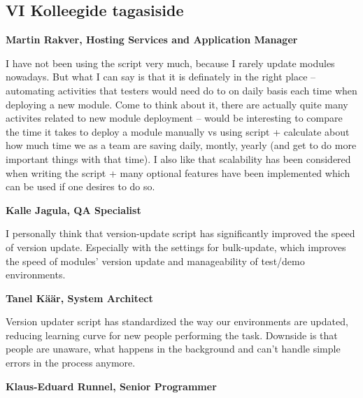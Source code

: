 \documentclass[12pt]{article}
\begin{document}
  \subsection*{VI Kolleegide tagasiside}
  \label{feedback}
  
  \textbf{Martin Rakver, Hosting Services and Application Manager}
  
  \begin{displayquote}
  I have not been using the script very much, because I rarely update modules nowadays. But what I can say is that it is definately in the right place – automating activities that testers would need do to on daily basis each time when deploying a new module. Come to think about it, there are actually quite many activites related to new module deployment – would be interesting to compare the time it takes to deploy a module manually vs using script + calculate about how much time we as a team are saving daily, montly, yearly (and get to do more important things with that time).
I also like that scalability has been considered when writing the script + many optional features have been implemented which can be used if one desires to do so.
  \end{displayquote}

  \textbf{Kalle Jagula, QA Specialist}
  
  \begin{displayquote}
  I personally think that version-update script has significantly improved the speed of version update. Especially with the settings for bulk-update, which improves the speed of modules' version update and manageability of test/demo environments.
  \end{displayquote}
  
  \textbf{Tanel Käär, System Architect}
  
  \begin{displayquote}
  Version updater script has standardized the way our environments are updated, reducing learning curve for new people performing the task. Downside is that people are unaware, what happens in the background and can't handle simple errors in the process anymore.
  \end{displayquote}
  
  \textbf{Klaus-Eduard Runnel, Senior Programmer}
  
\end{document}
